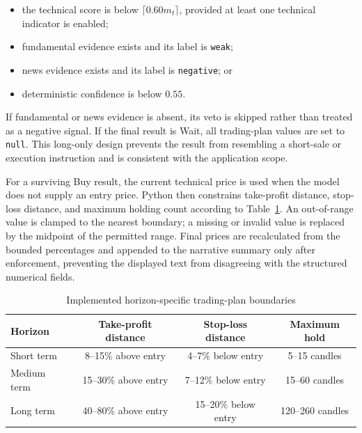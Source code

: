 \begin{itemize}
    \item the technical score is below $\lceil 0.60m_t \rceil$, provided at least one technical indicator is enabled;
    \item fundamental evidence exists and its label is \texttt{weak};
    \item news evidence exists and its label is \texttt{negative}; or
    \item deterministic confidence is below $0.55$.
\end{itemize}

If fundamental or news evidence is absent, its veto is skipped rather than treated as a negative signal. If the final result is Wait, all trading-plan values are set to \texttt{null}. This long-only design prevents the result from resembling a short-sale or execution instruction and is consistent with the application scope.

For a surviving Buy result, the current technical price is used when the model does not supply an entry price. Python then constrains take-profit distance, stop-loss distance, and maximum holding count according to Table~\ref{tab:horizon-price-boundaries}. An out-of-range value is clamped to the nearest boundary; a missing or invalid value is replaced by the midpoint of the permitted range. Final prices are recalculated from the bounded percentages and appended to the narrative summary only after enforcement, preventing the displayed text from disagreeing with the structured numerical fields.

\begin{table}[H]
    \centering
    \caption{Implemented horizon-specific trading-plan boundaries}
    \label{tab:horizon-price-boundaries}
    \small
    \setlength{\tabcolsep}{7pt}
    \renewcommand{\arraystretch}{1.2}
    \begin{tabular}{lccc}
        \toprule
        \textbf{Horizon} & \textbf{Take-profit distance} & \textbf{Stop-loss distance} & \textbf{Maximum hold} \\
        \midrule
        Short term & 8--15\% above entry & 4--7\% below entry & 5--15 candles \\
        Medium term & 15--30\% above entry & 7--12\% below entry & 15--60 candles \\
        Long term & 40--80\% above entry & 15--20\% below entry & 120--260 candles \\
        \bottomrule
    \end{tabular}
\end{table}

